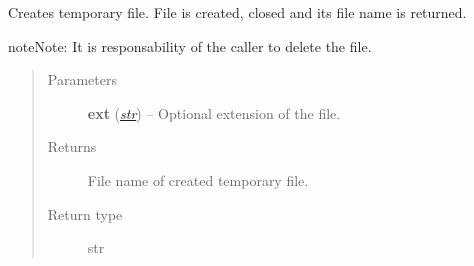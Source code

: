 \documentclass[a4paper,10pt,english]{sphinxmanual}
\begin{document}
\begin{fulllineitems}
\label{aqueduct.utils.helpers:aqueduct.utils.helpers.create_tmpfile}
Creates temporary file. File is created, closed and its file name is returned.

\begin{notice}{note}{Note:}
It is responsability of the caller to delete the file.
\end{notice}
\begin{quote}\begin{description}
\item[{Parameters}] \leavevmode
\textbf{ext} (\href{http://docs.python.org/2/library/functions.html\#str}{\emph{str}}) -- Optional extension of the file.

\item[{Returns}] \leavevmode
File name of created temporary file.

\item[{Return type}] \leavevmode
str

\end{description}\end{quote}

\end{fulllineitems}

\end{document}
